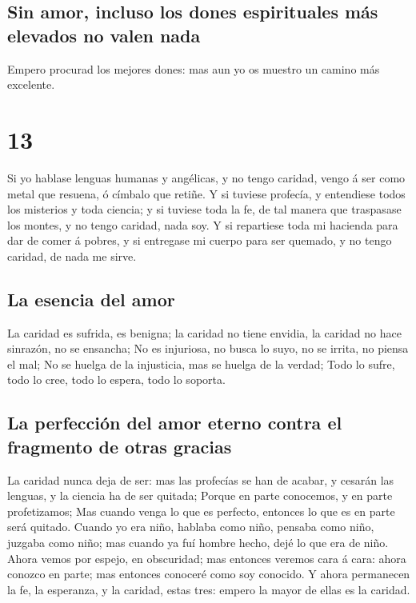 \hypertarget{sin-amor-incluso-los-dones-espirituales-muxe1s-elevados-no-valen-nada}{%
\subsection{Sin amor, incluso los dones espirituales más elevados no
valen
nada}\label{sin-amor-incluso-los-dones-espirituales-muxe1s-elevados-no-valen-nada}}

 Empero procurad los mejores dones: mas aun yo os muestro
un camino más excelente.

\hypertarget{section-46-13}{%
\section{13}\label{section-46-13}}

 Si yo hablase lenguas humanas y angélicas, y no tengo
caridad, vengo á ser como metal que resuena, ó címbalo que retiñe.
 Y si tuviese profecía, y entendiese todos los misterios y
toda ciencia; y si tuviese toda la fe, de tal manera que traspasase los
montes, y no tengo caridad, nada soy.  Y si repartiese
toda mi hacienda para dar de comer á pobres, y si entregase mi cuerpo
para ser quemado, y no tengo caridad, de nada me sirve.

\hypertarget{la-esencia-del-amor}{%
\subsection{La esencia del amor}\label{la-esencia-del-amor}}

 La caridad es sufrida, es benigna; la caridad no tiene
envidia, la caridad no hace sinrazón, no se ensancha;  No
es injuriosa, no busca lo suyo, no se irrita, no piensa el mal;
 No se huelga de la injusticia, mas se huelga de la
verdad;  Todo lo sufre, todo lo cree, todo lo espera, todo
lo soporta.

\hypertarget{la-perfecciuxf3n-del-amor-eterno-contra-el-fragmento-de-otras-gracias}{%
\subsection{La perfección del amor eterno contra el fragmento de otras
gracias}\label{la-perfecciuxf3n-del-amor-eterno-contra-el-fragmento-de-otras-gracias}}

 La caridad nunca deja de ser: mas las profecías se han de
acabar, y cesarán las lenguas, y la ciencia ha de ser quitada;
 Porque en parte conocemos, y en parte profetizamos;
 Mas cuando venga lo que es perfecto, entonces lo que es
en parte será quitado.  Cuando yo era niño, hablaba como
niño, pensaba como niño, juzgaba como niño; mas cuando ya fuí hombre
hecho, dejé lo que era de niño.  Ahora vemos por espejo,
en obscuridad; mas entonces veremos cara á cara: ahora conozco en parte;
mas entonces conoceré como soy conocido.  Y ahora
permanecen la fe, la esperanza, y la caridad, estas tres: empero la
mayor de ellas es la caridad.


